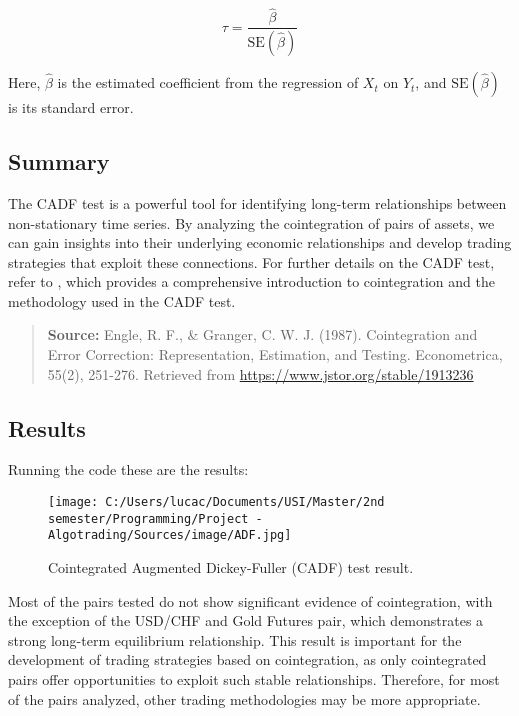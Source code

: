 \documentclass{article}
\begin{document}
\[
\tau = \frac{\hat{\beta}}{\text{SE}(\hat{\beta})}
\]

Here, \( \hat{\beta} \) is the estimated coefficient from the regression of \( X_t \) on \( Y_t \), and \( \text{SE}(\hat{\beta}) \) is its standard error.

\subsection{Summary}
The CADF test is a powerful tool for identifying long-term relationships between non-stationary time series. By analyzing the cointegration of pairs of assets, we can gain insights into their underlying economic relationships and develop trading strategies that exploit these connections.
For further details on the CADF test, refer to \textcite{engle1987cointegration}, which provides a comprehensive introduction to cointegration and the methodology used in the CADF test.

\begin{quote}
\textbf{Source:} Engle, R. F., \& Granger, C. W. J. (1987). Cointegration and Error Correction: Representation, Estimation, and Testing. Econometrica, 55(2), 251-276. Retrieved from \url{https://www.jstor.org/stable/1913236}
\end{quote}

\subsection*{Results}
Running the code these are the results:
\begin{figure}[h]
    \centering
    \texttt{[image: C:/Users/lucac/Documents/USI/Master/2nd semester/Programming/Project - Algotrading/Sources/image/ADF.jpg]}
    
    \caption{Cointegrated Augmented Dickey-Fuller (CADF) test result.}
    \label{fig:ADF}
\end{figure}

Most of the pairs tested do not show significant evidence of cointegration, with the exception of the USD/CHF and Gold Futures pair, which demonstrates a strong long-term equilibrium relationship. This result is important for the development of trading strategies based on cointegration, as only cointegrated pairs offer opportunities to exploit such stable relationships. Therefore, for most of the pairs analyzed, other trading methodologies may be more appropriate.

\clearpage
\end{document}
